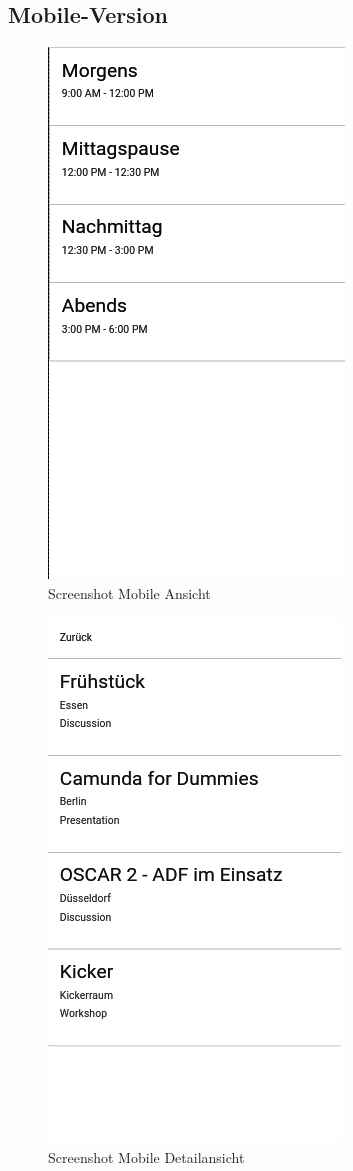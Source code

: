 \begin{appendices}
\subsection{Mobile-Version}
\begin{figure}[h]
\includegraphics[scale=0.8]{img/mobile_view.png}
\caption{Screenshot Mobile Ansicht}
\end{figure}
\begin{figure}[h]
\includegraphics[scale=0.8]{img/mobile_inner_screenshot.png}
\caption{Screenshot Mobile Detailansicht}
\end{figure}
\end{appendices}


